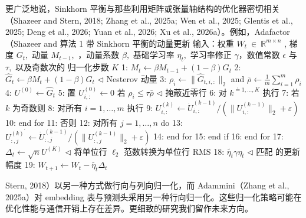 更广泛地说，Sinkhorn 平衡与那些利用矩阵或张量轴结构的优化器密切相关（Shazeer and Stern, 2018; Zhang et al., 2025a; Wen et al., 2025; Glentis et al., 2025; Deng et al., 2026; Yuan et al., 2026; Xu et al., 2026a）。例如，Adafactor（Shazeer and
算法 1 带 Sinkhorn 平衡的动量更新 输入：权重
\(W _ { t } \ \in \ \mathbb { R } ^ { m \times n }\) , 梯度
\(G _ { t } ,\) 动量 \(M _ { t - 1 } ,\) ，动量系数
\(\beta ,\) 基础学习率 \(\eta _ { t } ,\) 学习率修正 $\gamma$，数值常数 $\epsilon$ 与 \(\tau ,\) 以及奇数次的
归一化步数 \(K\) 1:
\(M _ { t } \gets \beta M _ { t - 1 } + ( 1 - \beta ) G _ { t }\) 2:
\(\widehat { G } _ { t } \gets \beta M _ { t } + ( 1 - \beta ) G _ { t }\)
$\triangleleft$ Nesterov 动量 3:
\(\rho _ { i } \gets \| \widehat { G } _ { t , i , : } \| _ { 2 }\) and
\(\textstyle { \bar { \rho } } \gets { \frac { 1 } { m } } \sum _ { i = 1 } ^ { m } \rho _ { i }\)
4: \(U ^ { ( 0 ) } \gets \widehat { G } _ { t }\) 5: 置
\(U _ { i , : } ^ { ( 0 ) } \gets 0\) 若
\(\rho _ { i } \leqslant \tau \bar { \rho }\) $\triangleleft$ 掩蔽近零行 6:
对 \(k ^ { \stackrel { \prime } { = } 1 , \ldots , K }\) 执行 7: 若 $k$ 为奇数则 8: 对所有 \(i = 1 , \ldots , m\) 执行 9:
\(U _ { i , : } ^ { ( k ) } \gets \dot { U } _ { i , : } ^ { ( k - 1 ) } / ( \| U _ { i , : } ^ { ( k - 1 ) } \| _ { 2 } + \varepsilon )\)
10: end for 11: 否则 12: 对所有 \(j = 1 , \dotsc , n\) do 13:
\(U _ { : , j } ^ { ( k ) ^ { \prime } } \gets \dot { U } _ { : , j } ^ { ( k - 1 ) } / ( \lVert U _ { : , j } ^ { ( k - 1 ) } \rVert _ { 2 } + \varepsilon )\)
14: end for 15: end if 16: end for 17:
\(\Delta _ { t } \gets \sqrt { n } U ^ { ( K ) }\) $\triangleleft$ 将单位行
\(\ell _ { 2 }\) 范数转换为单位行 RMS 18:
\(\widetilde { \eta _ { t } }  \gamma \eta _ { t }\) $\triangleleft$ 匹配
的更新幅度 19:
\(W _ { t + 1 } \gets W _ { t } - \widetilde { \eta _ { t } } \Delta _ { t }\)

Stern, 2018）以另一种方式做行向与列向归一化，而 Adammini（Zhang et al., 2025a）对 embedding 表与预测头采用另一种行向归一化。这些归一化策略可能在优化性能与通信开销上存在差异。更细致的研究我们留作未来方向。